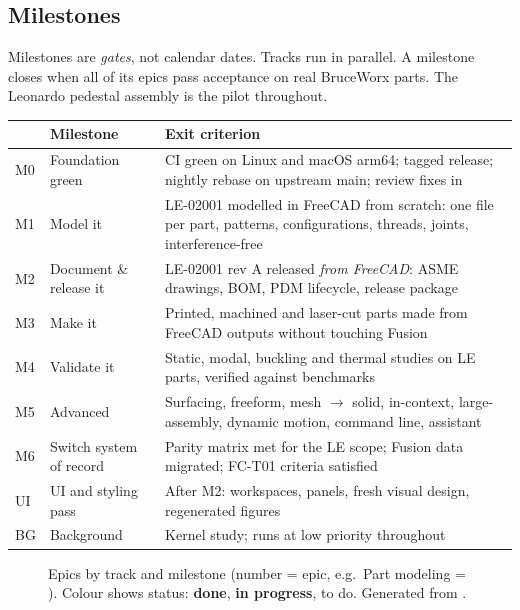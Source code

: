 \subsection{Milestones}

Milestones are \emph{gates}, not calendar dates. Tracks run in parallel. A milestone closes when all of its
epics pass acceptance on real BruceWorx parts. The Leonardo pedestal assembly  is the pilot
throughout.

\begin{center}
\small
\begin{tabularx}{\linewidth}{@{}lp{4.3cm}X@{}}
\toprule
& Milestone & Exit criterion\\
\midrule
M0 & Foundation green & CI green on Linux and macOS arm64; tagged release; nightly rebase on upstream main; review fixes in\\
M1 & Model it & LE-02001 modelled in FreeCAD from scratch: one file per part, patterns, configurations, threads, joints, interference-free\\
M2 & Document \& release it & LE-02001 rev A released \emph{from FreeCAD}: ASME drawings, BOM, PDM lifecycle, release package\\
M3 & Make it & Printed, machined and laser-cut parts made from FreeCAD outputs without touching Fusion\\
M4 & Validate it & Static, modal, buckling and thermal studies on LE parts, verified against benchmarks\\
M5 & Advanced & Surfacing, freeform, mesh $\rightarrow$ solid, in-context, large-assembly, dynamic motion, command line, assistant\\
M6 & Switch system of record & Parity matrix met for the LE scope; Fusion data migrated; FC-T01 criteria satisfied\\
UI & UI and styling pass & After M2: workspaces, panels, fresh visual design, regenerated figures\\
BG & Background & Kernel study; runs at low priority throughout\\
\bottomrule
\end{tabularx}
\end{center}

\begin{figure}[ht]
\centering

\caption{Epics by track and milestone (number = epic, e.g.\ Part modeling  = ).
Colour shows status: \textcolor{bwgreen}{\textbf{done}}, \textcolor{bworange}{\textbf{in progress}}, to do.
Generated from .}
\label{fig:swim}
\end{figure}

